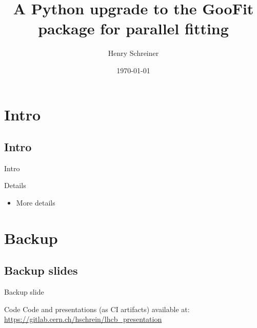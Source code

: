 \documentclass{beamer}
\title{A Python upgrade to the GooFit package for parallel fitting}
\author{Henry Schreiner\textcolor{lhcbRed}{\inst{1 }}}
\institute{\inst{1} University of Cincinnati}
\date{\today}
\begin{document}
\begin{frame}
\titlepage
\end{frame}

\section{Intro}
\subsection{Intro}
\begin{frame}{Intro}

  \begin{block}{Details}
    \begin{itemize}
    	\item More details
   \end{itemize}
  \end{block}
  
\end{frame}


\backupbegin
\section{Backup}

\subsection{Backup slides}
\begin{frame}{Backup slide}
\end{frame}

\begin{frame}{Code}
	Code and presentations (as CI artifacts) available at: \url{https://gitlab.cern.ch/hschrein/lhcb_presentation}
\end{frame}

\backupend
\end{document}
